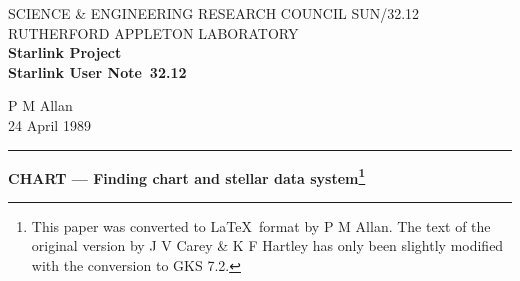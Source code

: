 \pagestyle{myheadings}

\newcommand{\stardoccategory}  {Starlink User Note}
\newcommand{\stardocinitials}  {SUN}
\newcommand{\stardocnumber}    {32.12}
\newcommand{\stardocauthors}   {P M Allan}
\newcommand{\stardocdate}      {24 April 1989}
\newcommand{\stardoctitle}     {CHART --- Finding chart and stellar data
system\footnote{This paper was converted to \LaTeX\ format by P M Allan.
The text of the original version by J V Carey \& K F Hartley has only been
slightly modified with the conversion to GKS 7.2.}
}

\newcommand{\stardocname}{\stardocinitials /\stardocnumber}
\markright{\stardocname}
\setlength{\textwidth}{160mm}
\setlength{\textheight}{240mm}
\setlength{\topmargin}{-5mm}
\setlength{\oddsidemargin}{0mm}
\setlength{\evensidemargin}{0mm}
\setlength{\parindent}{0mm}
\setlength{\parskip}{\medskipamount}
\setlength{\unitlength}{1mm}



\thispagestyle{empty}
SCIENCE \& ENGINEERING RESEARCH COUNCIL \hfill \stardocname\\
RUTHERFORD APPLETON LABORATORY\\
{\large\bf Starlink Project\\}
{\large\bf \stardoccategory\ \stardocnumber}
\begin{flushright}
\stardocauthors\\
\stardocdate
\end{flushright}
\vspace{-4mm}
\rule{\textwidth}{0.5mm}
\vspace{5mm}
\begin{center}
{\Large\bf \stardoctitle}
\end{center}
\vspace{5mm}


